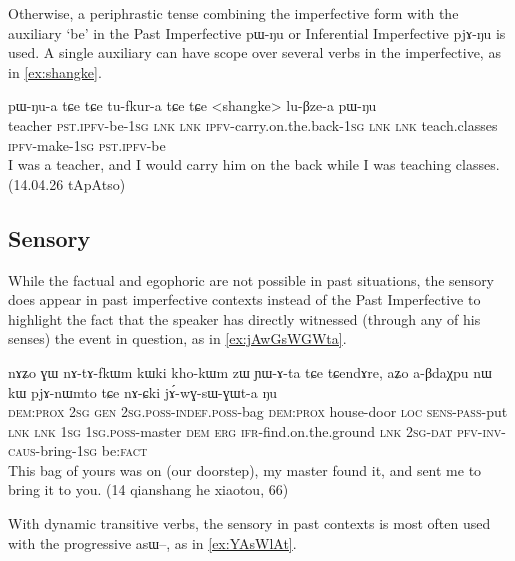 \documentclass[oldfontcommands,oneside,a4paper,11pt]{article}
\newcommand{\ipa}[1]{{\phon \mbox{#1}}} %
\newcommand{\factual}[1]{\textsc{:fact}}
\begin{document}
Otherwise, a periphrastic tense combining the imperfective form with the auxiliary `be' in the Past Imperfective \ipa{pɯ-ŋu} or Inferential Imperfective \ipa{pjɤ-ŋu}  is used.   A single auxiliary  can have scope over several verbs in the imperfective, as in \ref{ex:shangke}.

\begin{exe}
\ex \label{ex:shangke}
\gll  \ipa{sloχpɯn} 	\ipa{pɯ-ŋu-a} 	\ipa{tɕe} 	\ipa{tɕe} 	\ipa{tu-fkur-a} 	\ipa{tɕe} 	\ipa{tɕe} 	 <shangke> 	\ipa{lu-βze-a} 	\ipa{pɯ-ŋu} \\
teacher \textsc{pst.ipfv}-be-\textsc{1sg} \textsc{lnk}  \textsc{lnk} \textsc{ipfv}-carry.on.the.back-\textsc{1sg} \textsc{lnk}  \textsc{lnk}  teach.classes \textsc{ipfv}-make-\textsc{1sg} \textsc{pst.ipfv}-be \\
\glt I was a teacher, and I would carry him on the back while I was teaching classes. (14.04.26 tApAtso)
\end{exe}


\subsection{Sensory}  \label{sec:pst:sens}
While the factual and egophoric are not possible in past situations, the sensory does appear in past imperfective contexts instead of the Past Imperfective to highlight the fact that the speaker  has directly witnessed (through any of his senses) the event in question, as in \ref{ex:jAwGsWGWta}. 

\begin{exe}
\ex \label{ex:jAwGsWGWta}
\gll  \ipa{kɯki} 	\ipa{nɤʑo} 	\ipa{ɣɯ} 	\ipa{nɤ-tɤ-fkɯm} 	\ipa{kɯki} 	\ipa{kho-kɯm} 	\ipa{zɯ} 	\ipa{ɲɯ-ɤ-ta} 	\ipa{tɕe} 	\ipa{tɕendɤre,} \ipa{aʑo} 	\ipa{a-βdaχpu} 	\ipa{nɯ} 	\ipa{kɯ} 	\ipa{pjɤ-nɯmto} 	\ipa{tɕe} 	\ipa{nɤ-ɕki} 	\ipa{jɤ́-wɣ-sɯ-ɣɯt-a} 	\ipa{ŋu}  \\
 \textsc{dem:prox}  \textsc{2sg} \textsc{gen} \textsc{2sg.poss-indef.poss}-bag \textsc{dem:prox} house-door \textsc{loc} \textsc{sens-pass}-put \textsc{lnk} \textsc{lnk} \textsc{1sg} \textsc{1sg.poss}-master \textsc{dem} \textsc{erg} \textsc{ifr}-find.on.the.ground  \textsc{lnk} \textsc{2sg-dat} \textsc{pfv-inv-caus}-bring-\textsc{1sg} be\factual{} \\
\glt This bag of yours was on (our doorstep), my master found it, and sent me to bring it to you. (14 qianshang he xiaotou, 66)
\end{exe}

With dynamic transitive verbs, the sensory in past contexts is most often used with the progressive \ipa{asɯ--}, as in \ref{ex:YAsWlAt}.
\end{document}
